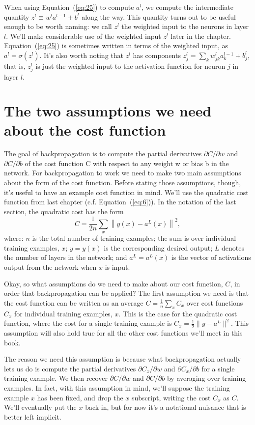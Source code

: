 \documentclass[a4paper,twoside,10pt]{book}
\begin{document}
When using Equation~(\ref{eq:25}) to compute $a^l$, we compute the intermediate quantity $z^l \equiv w^l a^{l-1}+b^l$ along the way. This quantity turns out to be useful enough to be worth naming: we call $z^l$ the weighted input to the neurons in layer $l$. We'll make considerable use of the weighted input $z^l$ later in the chapter. Equation~(\ref{eq:25}) is sometimes written in terms of the weighted input, as $a^l=\sigma(z^l)$. It's also worth noting that $z^l$ has components $z^l_j= \sum_k w^l_{jk} a^{l-1}_k+b^l_j$, that is, $z^l_j$ is just the weighted input to the activation function for neuron $j$ in layer $l$.

\section{The two assumptions we need about the cost function}
The goal of backpropagation is to compute the partial derivatives $\partial{}C/\partial{}w$ and $\partial{}C/\partial{}b$ of the cost function C with respect to any weight w or bias b in the network. For backpropagation to work we need to make two main assumptions about the form of the cost function. Before stating those assumptions, though, it's useful to have an example cost function in mind. We'll use the quadratic cost function from last chapter (c.f. Equation~(\ref{eq:6})). In the notation of the last section, the quadratic cost has the form
\begin{equation}
C = \frac{1}{2n} \sum_x \left\|y(x)-a^L(x)\right\|^2,
\tag{26}\label{eq:26}
\end{equation}
where: $n$ is the total number of training examples; the sum is over individual training examples, $x$; $y=y(x)$ is the corresponding desired output; $L$ denotes the number of layers in the network; and $a^L=a^L(x)$ is the vector of activations output from the network when $x$ is input.

Okay, so what assumptions do we need to make about our cost function, $C$, in order that backpropagation can be applied? The first assumption we need is that the cost function can be written as an average $C=\frac1n\sum_xC_x$ over cost functions $C_x$ for individual training examples, $x$. This is the case for the quadratic cost function, where the cost for a single training example is $C_x=\frac12\|y-a^L\|^2$. This assumption will also hold true for all the other cost functions we'll meet in this book.

The reason we need this assumption is because what backpropagation actually lets us do is compute the partial derivatives $\partial{}C_x/\partial{}w$ and $\partial{}C_x/\partial{}b$ for a single training example. We then recover $\partial{}C/\partial{}w$ and $\partial{}C/\partial{}b$ by averaging over training examples. In fact, with this assumption in mind, we'll suppose the training example $x$ has been fixed, and drop the $x$ subscript, writing the cost $C_x$ as $C$. We'll eventually put the $x$ back in, but for now it's a notational nuisance that is better left implicit.
\end{document}
